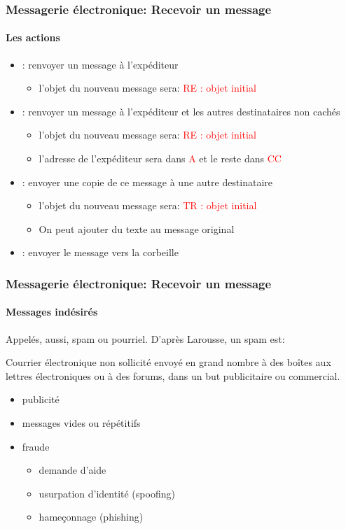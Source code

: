 \documentclass[xcolor=table]{beamer}
\begin{document}
\begin{frame}
\frametitle{Messagerie électronique: Recevoir un message}
\framesubtitle{Les actions}

\begin{itemize}
	\item {}: renvoyer un message à l'expéditeur
	\begin{itemize}
		\item l'objet du nouveau message sera: \textcolor{red}{RE : objet initial}
	\end{itemize}
	\item {}: renvoyer un message à l'expéditeur et les autres destinataires non cachés
	\begin{itemize}
		\item l'objet du nouveau message sera: \textcolor{red}{RE : objet initial}
		\item l'adresse de l'expéditeur sera dans \textcolor{red}{A} et le reste dans \textcolor{red}{CC}
	\end{itemize}
	
	\item {}: envoyer une copie de ce message à une autre destinataire  
	\begin{itemize}
		\item l'objet du nouveau message sera: \textcolor{red}{TR : objet initial}
		\item On peut ajouter du texte au message original
	\end{itemize}
	
	\item {}: envoyer le message vers la corbeille 
	
\end{itemize}


\end{frame}

\begin{frame}
\frametitle{Messagerie électronique: Recevoir un message}
\framesubtitle{Messages indésirés}

Appelés, aussi, spam ou pourriel. D'après Larousse, un spam est:
\begin{definition}
	Courrier électronique non sollicité envoyé en grand nombre à des boîtes aux lettres électroniques ou à des forums, dans un but publicitaire ou commercial.
\end{definition}

\begin{itemize}
	\item publicité
	\item messages vides ou répétitifs
	\item fraude
	\begin{itemize}
		\item demande d'aide
		\item usurpation d'identité (spoofing)
		\item hameçonnage (phishing)
	\end{itemize}
\end{itemize}

\end{frame}
\end{document}
